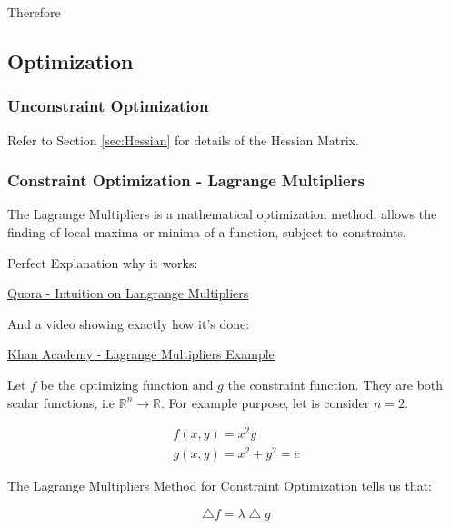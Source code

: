 Therefore


\subsection{Optimization}

\subsubsection{Unconstraint Optimization}

Refer to Section \ref{sec:Hessian} for details of the Hessian Matrix.


\subsubsection{Constraint Optimization - Lagrange Multipliers} \label{sec:Lagrange}

The Lagrange Multipliers is a mathematical optimization method, allows the finding of local maxima or minima of a function, subject to constraints.

Perfect Explanation why it works:

\href{https://www.quora.com/Why-does-the-method-of-Lagrange-multipliers-work-for-optimization-in-multivariable-calculus-Why-exactly-given-a-function-f-x-y-and-a-constraint-g-x-y-c-can-we-set-the-gradients-of-the-functions-to-be-multiples-of-each-other}{\ul{Quora - Intuition on Langrange Multipliers}}

And a video showing exactly how it's done:

\href{https://www.youtube.com/watch?v=yuqB-d5MjZA}{\ul{Khan Academy - Lagrange Multipliers Example}}

\vspace{.5cm}


Let $f$ be the optimizing function and $g$ the constraint function. They are both scalar functions, i.e $\mathds{R}^n \rightarrow \mathds{R}$. For example purpose, let is consider $n = 2$.

\begin{gather}
    f(x,y) = x^2 y \\
    g(x,y) = x^2+y^2 = c
\end{gather}

The Lagrange Multipliers Method for Constraint Optimization tells us that:

\begin{equation} \label{eq:lagMult}
    \bigtriangleup f = \lambda \bigtriangleup g
\end{equation}

